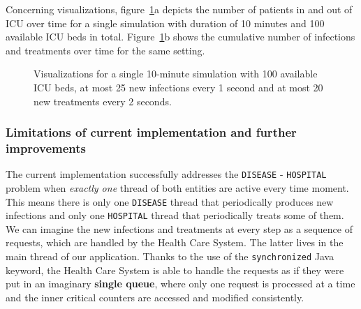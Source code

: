 \documentclass[acmlarge]{acmart}
\newcommand{\disease}{{\small \texttt{DISEASE}} }
\newcommand{\hospital}{{\small \texttt{HOSPITAL}} }
\begin{document}
Concerning visualizations, figure~\ref{img:disease_hospital_visualizations}a depicts the number of patients in and out of ICU over time for a single simulation with duration of 10 minutes and 100 available ICU beds in total. Figure~\ref{img:disease_hospital_visualizations}b shows the cumulative number of infections and treatments over time for the same setting.

\begin{figure}[h]
  \centering
  \caption{Visualizations for a single 10-minute simulation with 100 available ICU beds, at most 25 new infections every 1 second and at most 20 new treatments every 2 seconds.}
  \label{img:disease_hospital_visualizations}
\end{figure}



\subsubsection{Limitations of current implementation and further improvements}
The current implementation successfully addresses the \disease - \hospital problem when \emph{exactly one} thread of both entities are active every time moment. This means there is only one \disease thread that periodically produces new infections and only one \hospital thread that periodically treats some of them. We can imagine the new infections and treatments at every step as a sequence of requests, which are handled by the Health Care System. The latter lives in the main thread of our application. Thanks to the use of the \texttt{synchronized} Java keyword, the Health Care System is able to handle the requests as if they were put in an imaginary \textbf{single queue}, where only one request is processed at a time and the inner critical counters are accessed and modified consistently.
\end{document}

